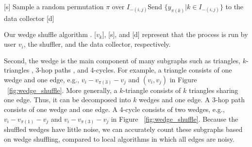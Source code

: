 \setlength{\algomargin}{5mm}
\begin{algorithm}[t]
  \SetAlgoLined
  [s] Sample a random permutation $\pi$ over $I_{-(i,j)}$\;
  [s] Send $\{y_{\pi(k)} | k \in I_{-(i,j)}\}$ to the data collector\;
  [d] 
  \caption{Our wedge shuffle algorithm \AlgWS{}. 
  [$v_k$], [s], and [d] represent that the process is run by user $v_i$, the shuffler, and the data collector, respectively. 
  }\label{alg:WShuffle}
\end{algorithm}

Second, the wedge is the main component of many subgraphs such as triangles, 
$k$-triangles \cite{Karwa_PVLDB11}, 
3-hop paths \cite{Sun_CCS19}, 
and 4-cycles. 
For example, a triangle consists of one wedge and one edge, e.g., $v_i-v_{\pi(3)}-v_j$ and $(v_i, v_j)$ in Figure ~\ref{fig:wedge_shuffle}. 
More generally, a $k$-triangle consists of $k$ triangles sharing one edge. 
Thus, it can be decomposed into $k$ wedges and one edge. 
A 3-hop path consists of one wedge and one edge. 
A 4-cycle consists of two wedges, e.g., $v_i-v_{\pi(1)}-v_j$ and $v_i-v_{\pi(3)}-v_j$ in Figure ~\ref{fig:wedge_shuffle}. 
Because the shuffled wedges have little noise, we can accurately count these subgraphs based on wedge shuffling, compared to local algorithms in which all edges are noisy. 


